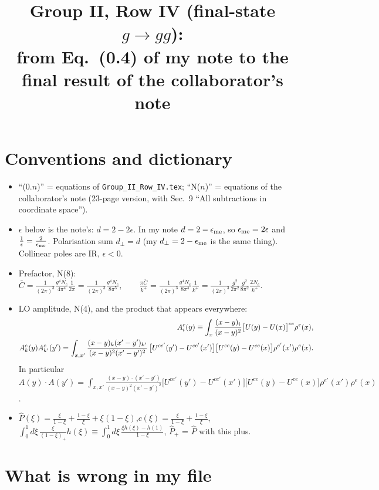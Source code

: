 \documentclass[10pt]{article}
\title{Group II, Row IV (final-state $g\to gg$):\\
from Eq.~(0.4) of my note to the final result of the collaborator's note}
\author{}
\date{}
\numberwithin{equation}{section}
\newcommand{\Wop}[2]{\big[U^{ce'}(#2)-U^{ce'}(x')\big]\big[U^{ce}(#1)-U^{ce}(x)\big]\rho^{e'}(x')\rho^{e}(x)}
\newcommand{\Kx}[2]{\frac{(x-#1)\cdot(x'-#2)}{(x-#1)^{2}(x'-#2)^{2}}}
\newcommand{\Cb}{\bar C}
\newcommand{\Ph}{\hat P}
\begin{document}
\maketitle
\vspace{-2.5em}

\section{Conventions and dictionary}
\begin{itemize}
\item ``(0.$n$)'' = equations of \texttt{Group\_II\_Row\_IV.tex}; ``N($n$)'' = equations of the collaborator's note
(23-page version, with Sec.~9 ``All subtractions in coordinate space'').
\item $\epsilon$ below is the note's: $d=2-2\epsilon$. In my note $d=2-\epsilon_{\rm me}$, so
$\epsilon_{\rm me}=2\epsilon$ and $\frac{1}{\epsilon}=\frac{2}{\epsilon_{\rm me}}$. Polarisation sum $d_\perp=d$
(my $d_\perp=2-\epsilon_{\rm me}$ is the same thing). Collinear poles are IR, $\epsilon<0$.
\item Prefactor, N(8):\quad
$\displaystyle \Cb=\frac{1}{(2\pi)^3}\frac{g^4N_c}{4\pi^4}\frac{1}{2\pi}=\frac{1}{(2\pi)^3}\frac{g^4N_c}{8\pi^5},\qquad
\frac{\pi\Cb}{k^+}=\frac{1}{(2\pi)^3}\frac{g^4N_c}{8\pi^4}\frac{1}{k^+}=\frac{1}{(2\pi)^3}\frac{g^2}{2\pi^2}\frac{g^2}{8\pi^2}\frac{2N_c}{k^+}.$
\item LO amplitude, N(4), and the product that appears everywhere:
\begin{align}\label{eq:A}
A^c_i(y)\equiv\int_x\frac{(x-y)_i}{(x-y)^2}\big[U(y)-U(x)\big]^{ce}\rho^e(x),\notag\\
A^c_k(y)A^c_{k'}(y')=\int_{x,x'}\frac{(x-y)_k(x'-y')_{k'}}{(x-y)^2(x'-y')^2}\,\Wop{y}{y'} .
\end{align}
In particular $A(y)\cdot A(y')=\int_{x,x'}\Kx{y}{y'}\Wop{y}{y'}$.
\item $\Ph(\xi)=\frac{\xi}{1-\xi}+\frac{1-\xi}{\xi}+\xi(1-\xi)$,\quad $c(\xi)=\frac{\xi}{1-\xi}+\frac{1-\xi}{\xi}$,\quad
$\int_0^1d\xi\,\frac{\xi}{(1-\xi)_+}h(\xi)\equiv\int_0^1d\xi\,\frac{\xi h(\xi)-h(1)}{1-\xi}$, $\Ph_+$ = $\Ph$ with this plus.
\end{itemize}

\section{What is wrong in my file}
\end{document}
